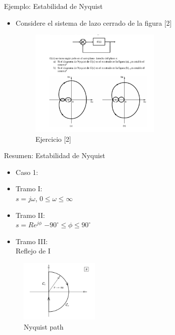 \documentclass{beamer}
\begin{document}
\begin{frame}{Ejemplo: Estabilidad de Nyquist}
\begin{justify}
\begin{itemize}
\item Considere el sistema de lazo cerrado de la figura [2]
    \begin{figure}[H]
    \centering
    \includegraphics[width=2.5in]{imagenes/EjemploNyquist.png}
    \caption{Ejercicio [2]}
    \label{niquist-function}
    \end{figure}
\end{itemize}
\end{justify}
\end{frame}

\begin{frame}{Resumen: Estabilidad de Nyquist}
\begin{justify}
\begin{multicols}{2}
\begin{itemize}
    \item Caso 1:
    \item Tramo I:
    \\
    $s=j\omega$,
    $0\leq\omega\leq\infty$  
    \item Tramo II:
    \\
    $s=Re^{j\phi}$
    $-90^\circ\leq\phi\leq90^\circ$     
    \item Tramo III:
    \\
    Reflejo de I
\end{itemize}

\begin{itemize}
    \begin{figure}[H]
    \centering
    \includegraphics[width=1.5in]{imagenes/nyquist-path.png}
    \caption{Nyquist path}
    \label{niquist-function}
    \end{figure}
\end{itemize}
\end{multicols}
\end{justify}
\end{frame}
\end{document}
